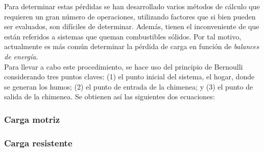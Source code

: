 Para determinar estas pérdidas se han desarrollado varios métodos de cálculo que requieren un gran número de operaciones, utilizando factores que si bien pueden ser evaluados, son difíciles de determinar. Además, tienen el inconveniente de que están referidos a sistemas que queman combustibles sólidos. Por tal motivo, actualmente es más común determinar la pérdida de carga en función de  \emph{balances de energía}.\\


Para llevar a cabo este procedimiento, se hace uso del principio de Bernoulli considerando tres puntos claves: (1) el punto inicial del sistema, el hogar, donde se generan los humos; (2) el punto de entrada de la chimenea; y (3) el punto de salida de la chimenea. Se obtienen así las siguientes dos ecuaciones:

\subsubsection{Carga motriz}

\subsubsection{Carga resistente}